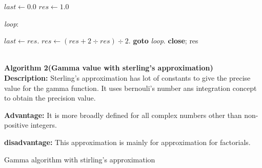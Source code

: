 \documentclass[12pt]{report}
\begin{document}
\EndProcedure
{}

  
\EndIf
\State $last \gets \textit{0.0}$
\State $res \gets \textit{1.0}$

\BState \emph{loop}:
     

\State $last \gets res$.
\State $res \gets (res {+} 2 \div res) \div 2  $.
\State \textbf{goto} \emph{loop}.
\State \textbf{close};
\EndIf
\State \Return res


\EndProcedure
\\

\textbf{Algorithm 2(Gamma value with sterling's approximation)}
\\

\textbf{Description: } Sterling's approximation has lot of constants to give the precise value for the gamma function. It uses bernouli's number ans integration concept to obtain the precision value.

\textbf{Advantage: }It is more broadly defined for all complex numbers other than non-positive integers.

\textbf{disadvantage: }This approximation is mainly for approximation for factorials.
\begin{algorithm}
\caption{Gamma algorithm with stirling's approximation}\label{alg:euclid}
\end{algorithm}
\newpage
\end{document}
